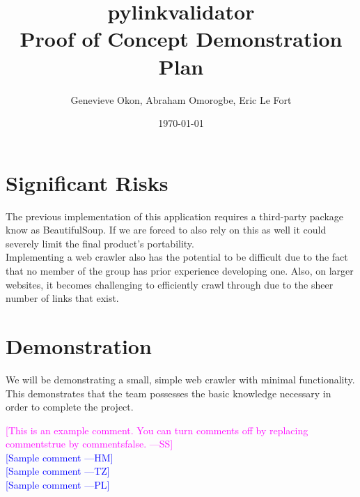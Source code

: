 \documentclass[12pt]{article}
\newcommand{\authornote}[3]{\textcolor{#1}{[#3 ---#2]}}
\newcommand{\authornote}[3]{}
\newcommand{\wss}[1]{\authornote{magenta}{SS}{#1}}
\newcommand{\hm}[1]{\authornote{blue}{HM}{#1}} %
\newcommand{\tz}[1]{\authornote{blue}{TZ}{#1}} %
\newcommand{\pl}[1]{\authornote{blue}{PL}{#1}} %
\begin{document}
\title{pylinkvalidator \\
 Proof of Concept Demonstration Plan }
\author{Genevieve Okon, Abraham Omorogbe, Eric Le Fort}
\date{\today}
\maketitle

	
\section{Significant Risks}
The previous implementation of this application requires a third-party package know as BeautifulSoup. If we are forced to also rely on this as well it could severely limit the final product's portability.\\

Implementing a web crawler also has the potential to be difficult due to the fact that no member of the group has prior experience developing one. Also, on larger websites, it becomes challenging to efficiently crawl through due to the sheer number of links that exist.\\

\section{Demonstration}
We will be demonstrating a small, simple web crawler with minimal functionality. This demonstrates that the team possesses the basic knowledge necessary in order to complete the project.

\noindent \wss{This is an example comment.  You can turn comments off by replacing
  commentstrue by commentsfalse.}\\
\hm{Sample comment}\\
\tz{Sample comment}\\
\pl{Sample comment}
\end{document}

